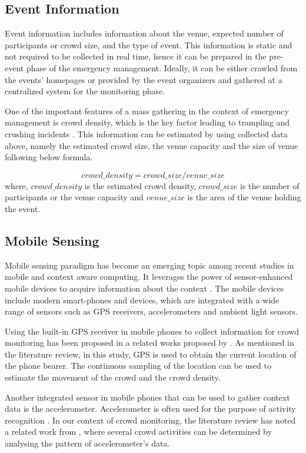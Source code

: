 \subsection{Event Information}
Event information includes information about the venue, expected number of participants or crowd size, and the type of event. This information is static and not required to be collected in real time, hence it can be prepared in the pre-event phase of the emergency management. Ideally, it can be either crawled from the events' homepages or provided by the event organizers and gathered at a centralized system for the monitoring phase.

One of the important features of a mass gathering in the context of emergency management is crowd density, which is the key factor leading to trampling and crushing incidents \citet{Hughes2009}. This information can be estimated by using collected data above, namely the estimated crowd size, the venue capacity and the size of venue following below formula.

\[
crowd\_density = crowd\_size / venue\_size
\]
where, \(crowd\_density\) is the estimated crowd density, \(crowd\_size\) is the number of participants or the venue capacity and \(venue\_size\) is the area of the venue holding the event.

\subsection{Mobile Sensing}

Mobile sensing paradigm has become an emerging topic among recent studies in mobile and context aware computing. It leverages the power of sensor-enhanced mobile devices to acquire information about the context \citep{guo2014participatory}. The mobile devices include modern smart-phones and devices, which are integrated with a wide range of sensors such as GPS receivers, accelerometers and ambient light sensors.

Using the built-in GPS receiver in mobile phones to collect information for crowd monitoring has been proposed in a related works proposed by \citet{Wirz2012}. As mentioned in the literature review, in this study, GPS is used to obtain the current location of the phone bearer. The continuous sampling of the location can be used to estimate the movement of the crowd and the crowd density.

Another integrated sensor in mobile phones that can be used to gather context data is the accelerometer. Accelerometer is often used for the purpose of activity recognition \citep{ravi2005activity, kwapisz2011activity}. In our context of crowd monitoring, the literature review has noted a related work from \citet{Roggen2011}, where several crowd activities can be determined by analysing the pattern of accelerometer's data.

